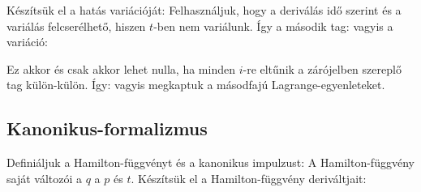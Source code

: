    Készítsük el a hatás variációját: 
   Felhasználjuk, hogy a deriválás idő szerint és a variálás felcserélhető, hiszen $t$-ben nem variálunk. Így a második tag:
   vagyis a variáció:
   
   Ez akkor és csak akkor lehet nulla, ha minden $i$-re eltűnik a zárójelben szereplő tag külön-külön. Így:
   vagyis megkaptuk a másodfajú Lagrange-egyenleteket. 
  
  \subsection{Kanonikus-formalizmus}
   
   Definiáljuk a Hamilton-függvényt és a kanonikus impulzust:
   A Hamilton-függvény saját változói a $q$ a $p$ és $t$. Készítsük el a Hamilton-függvény deriváltjait:
   
